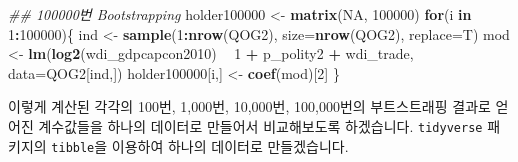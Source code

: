 \documentclass[
]{book}
\newenvironment{Shaded}{\begin{snugshade}}{\end{snugshade}}
\newcommand{\CommentTok}[1]{\textcolor[rgb]{0.56,0.35,0.01}{\textit{#1}}}
\newcommand{\ControlFlowTok}[1]{\textcolor[rgb]{0.13,0.29,0.53}{\textbf{#1}}}
\newcommand{\DataTypeTok}[1]{\textcolor[rgb]{0.13,0.29,0.53}{#1}}
\newcommand{\DecValTok}[1]{\textcolor[rgb]{0.00,0.00,0.81}{#1}}
\newcommand{\KeywordTok}[1]{\textcolor[rgb]{0.13,0.29,0.53}{\textbf{#1}}}
\newcommand{\NormalTok}[1]{#1}
\newcommand{\OperatorTok}[1]{\textcolor[rgb]{0.81,0.36,0.00}{\textbf{#1}}}
\newcommand{\OtherTok}[1]{\textcolor[rgb]{0.56,0.35,0.01}{#1}}
\newcommand{\StringTok}[1]{\textcolor[rgb]{0.31,0.60,0.02}{#1}}
\begin{document}
\begin{Shaded}
\begin{Highlighting}[]
\CommentTok{## 100000번 Bootstrapping}
\NormalTok{holder100000 <-}\StringTok{ }\KeywordTok{matrix}\NormalTok{(}\OtherTok{NA}\NormalTok{, }\DecValTok{100000}\NormalTok{)}
\ControlFlowTok{for}\NormalTok{(i }\ControlFlowTok{in} \DecValTok{1}\OperatorTok{:}\DecValTok{100000}\NormalTok{)\{}
\NormalTok{  ind <-}\StringTok{ }\KeywordTok{sample}\NormalTok{(}\DecValTok{1}\OperatorTok{:}\KeywordTok{nrow}\NormalTok{(QOG2), }
                \DataTypeTok{size=}\KeywordTok{nrow}\NormalTok{(QOG2), }\DataTypeTok{replace=}\NormalTok{T)}
\NormalTok{  mod <-}\StringTok{ }\KeywordTok{lm}\NormalTok{(}\KeywordTok{log2}\NormalTok{(wdi_gdpcapcon2010) }\OperatorTok{~}\StringTok{ }
\StringTok{              }\DecValTok{1} \OperatorTok{+}\StringTok{  }\NormalTok{p_polity2 }\OperatorTok{+}\StringTok{ }\NormalTok{wdi_trade, }
            \DataTypeTok{data=}\NormalTok{QOG2[ind,])}
\NormalTok{  holder100000[i,] <-}\StringTok{ }\KeywordTok{coef}\NormalTok{(mod)[}\DecValTok{2}\NormalTok{]}
\NormalTok{\}}
\end{Highlighting}
\end{Shaded}

이렇게 계산된 각각의 100번, 1,000번, 10,000번, 100,000번의 부트스트래핑 결과로 얻어진 계수값들을 하나의 데이터로 만들어서 비교해보도록 하겠습니다. \texttt{tidyverse} 패키지의 \texttt{tibble}을 이용하여 하나의 데이터로 만들겠습니다.
\end{document}
